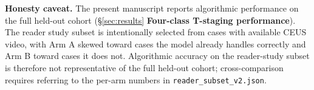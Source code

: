 \documentclass[11pt,a4paper]{article}
\begin{document}
\textbf{Honesty caveat.} The present manuscript reports algorithmic performance on the full held-out cohort (\S\ref{sec:results} \textbf{Four-class T-staging performance}). The reader study subset is intentionally selected from cases with available CEUS video, with Arm A skewed toward cases the model already handles correctly and Arm B toward cases it does not. Algorithmic accuracy on the reader-study subset is therefore not representative of the full held-out cohort; cross-comparison requires referring to the per-arm numbers in \texttt{reader\_subset\_v2.json}.
\end{document}
